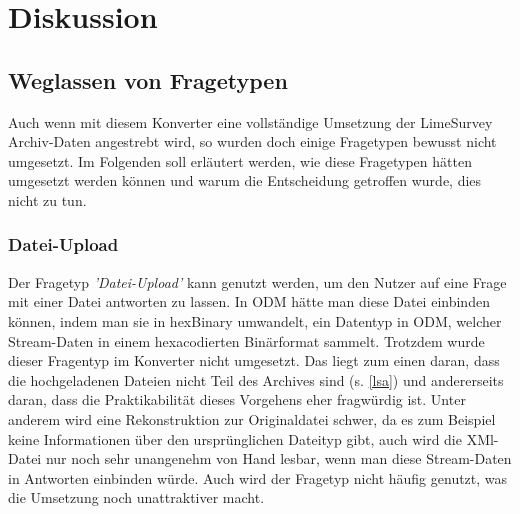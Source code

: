 \chapter{Diskussion}
\label{ch:diskussion}



\section{Weglassen von Fragetypen}

Auch wenn mit diesem Konverter eine vollständige Umsetzung der LimeSurvey Archiv-Daten angestrebt wird, so wurden doch einige Fragetypen bewusst nicht umgesetzt. Im Folgenden soll erläutert werden, wie diese Fragetypen hätten umgesetzt werden können und warum die Entscheidung getroffen wurde, dies nicht zu tun.

\subsection{Datei-Upload}

Der Fragetyp \textit{'Datei-Upload'} kann genutzt werden, um den Nutzer auf eine Frage mit einer Datei antworten zu lassen.
In ODM hätte man diese Datei einbinden können, indem man sie in hexBinary umwandelt, ein Datentyp in ODM, welcher Stream-Daten in einem hexacodierten Binärformat sammelt.
Trotzdem wurde dieser Fragentyp im Konverter nicht umgesetzt.
Das liegt zum einen daran, dass die hochgeladenen Dateien nicht Teil des Archives sind (s. \cref{lsa}) und andererseits daran, dass die Praktikabilität dieses Vorgehens eher fragwürdig ist.
Unter anderem wird eine Rekonstruktion zur Originaldatei schwer, da es zum Beispiel keine Informationen über den ursprünglichen Dateityp gibt, auch wird die XMl-Datei nur noch sehr unangenehm von Hand lesbar, wenn man diese Stream-Daten in Antworten einbinden würde. 
Auch wird der Fragetyp nicht häufig genutzt, was die Umsetzung noch unattraktiver macht.
